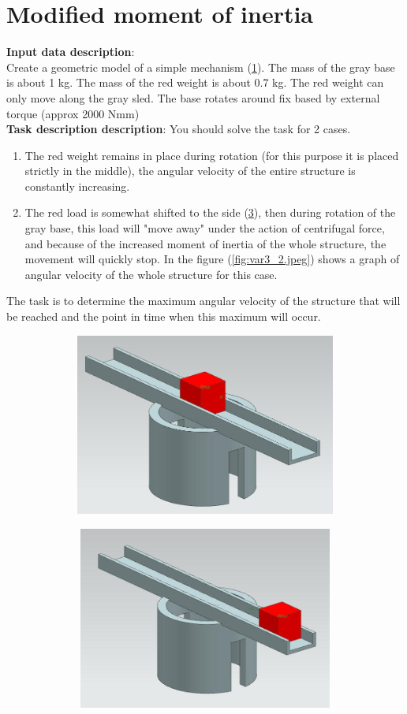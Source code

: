 \documentclass[12pt]{article}
\newcommand\ttask[3] 
 {
	\section*{#1}
	\textbf{Input data description}: \\ #2 \  \\
	\textbf{Task description description}: #3
	\newpage
 }
\begin{document}
\ttask{Modified moment of inertia}{
	Create a geometric model of a simple mechanism (\cref{fig:var3_0.jpeg}). The mass of the gray base is about 1 kg. The mass of the red weight is about 0.7 kg. The red weight can only move along the gray sled. The base rotates around fix based by external torque (approx 2000 Nmm)
}{
	You should solve the task for 2 cases.
	\begin{enumerate}
		\item The red weight remains in place during rotation (for this purpose it is placed strictly in the middle), the angular velocity of the entire structure is constantly increasing.
		\item The red load is somewhat shifted to the side (\cref{fig:var3_1.jpeg}), then during rotation of the gray base, this load will "move away" under the action of centrifugal force, and because of the increased moment of inertia of the whole structure, the movement will quickly stop. In the figure (\cref{fig:var3_2.jpeg}) shows a graph of angular velocity of the whole structure for this case.
	\end{enumerate}
	The task is to determine the maximum angular velocity of the structure that will be reached and the point in time when this maximum will occur.

	\begin{figure}[H]
		\begin{subfigure}{0.42\textwidth}
			\centering\includegraphics[height=6cm,width=1\textwidth,keepaspectratio]{var3_0.jpeg}
			\caption{}
			\label{fig:var3_0.jpeg}
		\end{subfigure}
		\begin{subfigure}{0.42\textwidth}
			\centering\includegraphics[height=6cm,width=1\textwidth,keepaspectratio]{var3_1.jpeg}
			\caption{}
			\label{fig:var3_1.jpeg}
		\end{subfigure}


\end{figure}}
\end{document}
